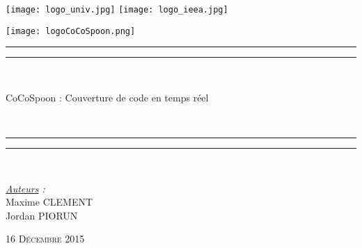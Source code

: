 \thispagestyle{cover}

\texttt{[image: logo\_univ.jpg]}
 \hfill \texttt{[image: logo\_ieea.jpg]} \\

\vspace*{15mm}

\begin{center}

	\vspace*{15mm}

	\texttt{[image: logoCoCoSpoon.png]}

	\rule[0.5ex]{\linewidth}{2pt}\vspace*{-\baselineskip}\vspace*{3.2pt}


	\rule[0.5ex]{\linewidth}{1pt}\\[\baselineskip]

		\begin{Huge}CoCoSpoon : Couverture de code en temps réel \end{Huge}\\[4mm]

	\rule[0.5ex]{\linewidth}{1pt}\vspace*{-\baselineskip}\vspace{3.2pt}
	\rule[0.5ex]{\linewidth}{2pt}\\

	\vspace*{20mm}

	{\LARGE \textit{\underline{Auteurs} :}}\\
	\vspace*{3mm}
	{\LARGE Maxime CLEMENT}\\
	\vspace*{3mm}
	{\LARGE Jordan PIORUN}\\
	
	\vspace*{20mm}
	
	{\LARGE\textsc{16 Décembre 2015}}
\end{center}